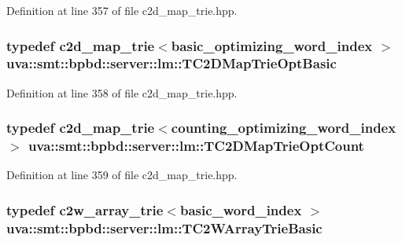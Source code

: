 Definition at line 357 of file c2d\+\_\+map\+\_\+trie.\+hpp.

\hypertarget{namespaceuva_1_1smt_1_1bpbd_1_1server_1_1lm_a56b8b6129cd9937e0a578484667f3c24}{}
\subsubsection[{T\+C2\+D\+Map\+Trie\+Opt\+Basic}]{\setlength{\rightskip}{0pt plus 5cm}typedef {\bf c2d\+\_\+map\+\_\+trie}$<${\bf basic\+\_\+optimizing\+\_\+word\+\_\+index} $>$ {\bf uva\+::smt\+::bpbd\+::server\+::lm\+::\+T\+C2\+D\+Map\+Trie\+Opt\+Basic}}\label{namespaceuva_1_1smt_1_1bpbd_1_1server_1_1lm_a56b8b6129cd9937e0a578484667f3c24}


Definition at line 358 of file c2d\+\_\+map\+\_\+trie.\+hpp.

\hypertarget{namespaceuva_1_1smt_1_1bpbd_1_1server_1_1lm_a30de341baef0836c7ebad764c9a043c1}{}
\subsubsection[{T\+C2\+D\+Map\+Trie\+Opt\+Count}]{\setlength{\rightskip}{0pt plus 5cm}typedef {\bf c2d\+\_\+map\+\_\+trie}$<${\bf counting\+\_\+optimizing\+\_\+word\+\_\+index} $>$ {\bf uva\+::smt\+::bpbd\+::server\+::lm\+::\+T\+C2\+D\+Map\+Trie\+Opt\+Count}}\label{namespaceuva_1_1smt_1_1bpbd_1_1server_1_1lm_a30de341baef0836c7ebad764c9a043c1}


Definition at line 359 of file c2d\+\_\+map\+\_\+trie.\+hpp.

\hypertarget{namespaceuva_1_1smt_1_1bpbd_1_1server_1_1lm_a66cae3aa9ccc8f9b7ca88c4cc9d06a1a}{}
\subsubsection[{T\+C2\+W\+Array\+Trie\+Basic}]{\setlength{\rightskip}{0pt plus 5cm}typedef {\bf c2w\+\_\+array\+\_\+trie}$<${\bf basic\+\_\+word\+\_\+index} $>$ {\bf uva\+::smt\+::bpbd\+::server\+::lm\+::\+T\+C2\+W\+Array\+Trie\+Basic}}\label{namespaceuva_1_1smt_1_1bpbd_1_1server_1_1lm_a66cae3aa9ccc8f9b7ca88c4cc9d06a1a}


